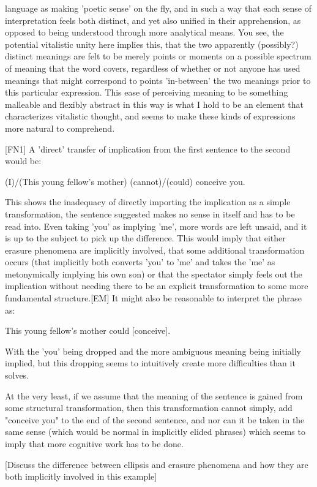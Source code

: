 \documentclass[]{article}
\begin{document}
language as making 'poetic sense' on the fly, and in such a way that each sense of interpretation feels both distinct, and yet also unified in their apprehension, as opposed to being understood through more analytical means. You see, the potential vitalistic unity here implies this, that the two apparently (possibly?) distinct meanings are felt to be merely points or moments on a possible spectrum of meaning that the word covers, regardless of whether or not anyone has used meanings that might correspond to points 'in-between' the two meanings prior to this particular expression. This ease of perceiving meaning to be something malleable and flexibly abstract in this way is what I hold to be an element that characterizes vitalistic thought, and seems to make these kinds of expressions more natural to comprehend.



[FN1] A 'direct' transfer of implication from the first sentence to the second would be:

(I)/(This young fellow's mother) (cannot)/(could) conceive you.

This shows the inadequacy of directly importing the implication as a simple transformation, the sentence suggested makes no sense in itself and has to be read into. Even taking 'you' as implying 'me', more words are left unsaid, and it is up to the subject to pick up the difference. This would imply that either erasure phenomena are implicitly involved, that some additional transformation occurs (that implicitly both converts 'you' to 'me' and takes the 'me' as metonymically implying his own son) or that the spectator simply feels out the implication without needing there to be an explicit transformation to some more fundamental structure.[EM] It might also be reasonable to interpret the phrase as:

This young fellow's mother could [conceive].

With the 'you' being dropped and the more ambiguous meaning being initially implied, but this dropping seems to intuitively create more difficulties than it solves.

At the very least, if we assume that the meaning of the sentence is gained from some structural transformation, then this transformation cannot simply, add "conceive you" to the end of the second sentence, and nor can it be taken in the same sense (which would be normal in implicitly elided phrases) which seems to imply that more cognitive work has to be done.

[Discuss the difference between ellipsis and erasure phenomena and how they are both implicitly involved in this example]
\end{document}
